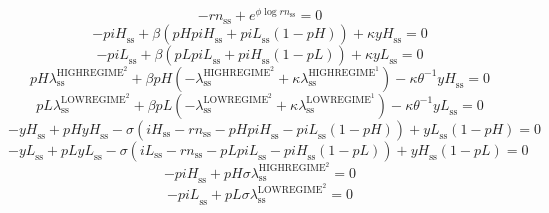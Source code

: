 \begin{equation}
-{r\!n}_\mathrm{ss} + e^{{\phi} {\log{{r\!n}_\mathrm{ss}}}} = 0
\end{equation}
\begin{equation}
-{p\!i\!H}_\mathrm{ss} + {\beta} \left({{p\!H}} {{p\!i\!H}_\mathrm{ss}} + {{p\!i\!L}_\mathrm{ss}} \left(1 - {p\!H}\right)\right) + {\kappa} {{y\!H}_\mathrm{ss}} = 0
\end{equation}
\begin{equation}
-{p\!i\!L}_\mathrm{ss} + {\beta} \left({{p\!L}} {{p\!i\!L}_\mathrm{ss}} + {{p\!i\!H}_\mathrm{ss}} \left(1 - {p\!L}\right)\right) + {\kappa} {{y\!L}_\mathrm{ss}} = 0
\end{equation}
\begin{equation}
{{p\!H}} {\lambda^{\mathrm{HIGHREGIME}^{\mathrm{2}}}_\mathrm{ss}} + {\beta} {{p\!H}} \left(-\lambda^{\mathrm{HIGHREGIME}^{\mathrm{2}}}_\mathrm{ss} + {\kappa} {\lambda^{\mathrm{HIGHREGIME}^{\mathrm{1}}}_\mathrm{ss}}\right) - {\kappa} {\theta}^{-1} {{y\!H}_\mathrm{ss}} = 0
\end{equation}
\begin{equation}
{{p\!L}} {\lambda^{\mathrm{LOWREGIME}^{\mathrm{2}}}_\mathrm{ss}} + {\beta} {{p\!L}} \left(-\lambda^{\mathrm{LOWREGIME}^{\mathrm{2}}}_\mathrm{ss} + {\kappa} {\lambda^{\mathrm{LOWREGIME}^{\mathrm{1}}}_\mathrm{ss}}\right) - {\kappa} {\theta}^{-1} {{y\!L}_\mathrm{ss}} = 0
\end{equation}
\begin{equation}
-{y\!H}_\mathrm{ss} + {{p\!H}} {{y\!H}_\mathrm{ss}} - {\sigma} \left({i\!H}_\mathrm{ss} - {r\!n}_\mathrm{ss} - {{p\!H}} {{p\!i\!H}_\mathrm{ss}} - {{p\!i\!L}_\mathrm{ss}} \left(1 - {p\!H}\right)\right) + {{y\!L}_\mathrm{ss}} \left(1 - {p\!H}\right) = 0
\end{equation}
\begin{equation}
-{y\!L}_\mathrm{ss} + {{p\!L}} {{y\!L}_\mathrm{ss}} - {\sigma} \left({i\!L}_\mathrm{ss} - {r\!n}_\mathrm{ss} - {{p\!L}} {{p\!i\!L}_\mathrm{ss}} - {{p\!i\!H}_\mathrm{ss}} \left(1 - {p\!L}\right)\right) + {{y\!H}_\mathrm{ss}} \left(1 - {p\!L}\right) = 0
\end{equation}
\begin{equation}
-{p\!i\!H}_\mathrm{ss} + {{p\!H}} {\sigma} {\lambda^{\mathrm{HIGHREGIME}^{\mathrm{2}}}_\mathrm{ss}} = 0
\end{equation}
\begin{equation}
-{p\!i\!L}_\mathrm{ss} + {{p\!L}} {\sigma} {\lambda^{\mathrm{LOWREGIME}^{\mathrm{2}}}_\mathrm{ss}} = 0
\end{equation}
